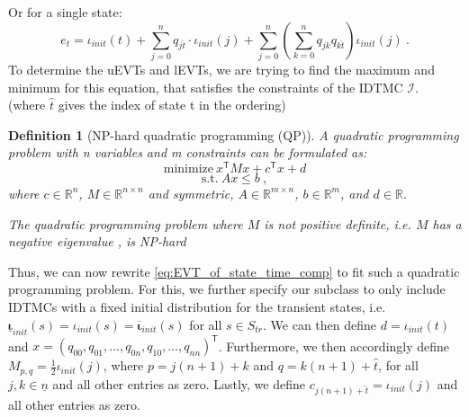 \documentclass[journal,compsoc,10pt]{IEEEtran}
\newcommand{\RR}{\mathbb{R}}
\newcommand{\IMC}{\mathcal{I}} %
\newcommand{\Initupper}{\mathbf{\overline{\iota}}_{init}}
\newcommand{\Initlower}{\mathbf{\underline{\iota}}_{init}}
\newcommand{\tod}{\todo[color=red!40]} %
\newcommand{\T}{\mathsf{T}}            %
\newtheorem{definition}{Definition}[section]
\begin{document}
Or for a single state: 
\begin{equation}\label{eq:EVT_of_state_time_comp}
    e_t = \iota_{init}(t)+\sum_{j=0}^n q_{j\hat{t}}\cdot \iota_{init}(j) + \sum_{j=0}^n (\sum_{k=0}^n q_{jk}q_{k\hat{t}})\iota_{init}(j)\ .
\end{equation}
To determine the uEVTs and lEVTs, we are trying to find the maximum and minimum for this equation, that satisfies the constraints of the IDTMC $\IMC$.
\\
(where $\hat{t}$ gives the index of state t in the ordering)
\begin{definition}[NP-hard quadratic programming (QP)]
    A quadratic programming problem with n variables and m constraints can be formulated as:
    \tod{find quote}
    \[\text{minimize}\ x^\T M x + c^\T x +d\]
    \[\text{s.t.}\ Ax \leq b\ ,\]
    where $c \in \RR^n$, $M \in \RR^{n\times n}$ and symmetric, $A\in \RR^{m\times n}$, $b\in \RR^m$, and $d\in \RR$.
    
    The quadratic programming problem where $M$ is not positive definite, i.e. $M$ has a negative eigenvalue \cite{QuadraticP_Pardalos}, is NP-hard
\end{definition}

Thus, we can now rewrite \cref{eq:EVT_of_state_time_comp} to fit such a quadratic programming problem. For this, we further specify our subclass to only include IDTMCs with a fixed initial distribution for the transient states, i.e. $\Initlower(s)= \iota_{init}(s)= \Initupper(s)$ for all $s\in S_{tr}$. We can then define $d=\iota_{init}(t)$ and $x = (q_{00},q_{01},\dots,q_{0n},q_{10},\dots,q_{nn})^\T$. Furthermore, we then accordingly define $M_{p,q}= \frac{1}{2}\iota_{init}(j)$, where $p=j(n+1)+k$ and $q= k(n+1)+\hat{t}$, for all $j,k\in \underline{n}$ and all other entries as zero. Lastly, we define $c_{j(n+1)+\hat{t}} = \iota_{init}(j)$ and all other entries as zero.
\end{document}
